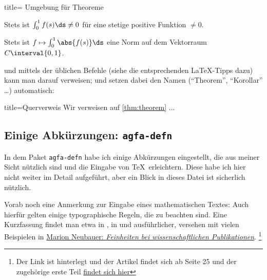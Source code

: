 \begin{tcblisting}{title= Umgebung für Theoreme}
%
\begin{theorem}\label{thm:theorem}
Stets ist $ \int_{ 0 }^{ 1 } f(s) \ds \neq 0 $ für eine stetige positive Funktion $ \neq 0 $.
\end{theorem}
%
\begin{corollary}\label{cor:folgerung}
Stets ist $ f \mapsto \int_{ 0 }^{ 1 } \abs{ f(s) }\ds $ eine Norm auf dem Vektorraum 
$ C\interval{0,1} $.
\end{corollary}
%
\end{tcblisting}
%
und mittels der üblichen Befehle (siehe die entsprechenden \LaTeX{}-Tipps dazu) kann man darauf verweisen;  und  setzen dabei den Namen (\enquote{Theorem}, \enquote{Korollar} \ldots) automatisch:
%
\begin{tcblisting}{title=Querverweis} 
Wir verweisen auf \vref{thm:theorem} ...
\end{tcblisting}
%
%
\subsection{Einige Abkürzungen: \texttt{agfa-defn}}\label{agfa-defn}
In dem Paket \texttt{agfa-defn} habe ich einige Abkürzungen eingestellt, die aus meiner Sicht nützlich sind und die Eingabe von \TeX\ erleichtern.
Diese habe ich hier nicht weiter im Detail aufgeführt, aber ein Blick in dieses Datei ist sicherlich nützlich.

Vorab noch eine Anmerkung zur Eingabe eines mathematischen Textes: Auch hierfür gelten einige typographische Regeln, die zu beachten sind.
Eine Kurzfassung findet man etwa in \textcite{nadler:formelsatz}, in \textcite[Kap. 9.1]{voss:2012a} und ausführlicher, versehen mit vielen Beispielen in \href{https://archiv.dante.de/DTK/PDF/komoedie_1997_1.pdf}{Marion Neubauer: \emph{Feinheiten bei wissenschaftlichen Publikationen}}.%
\footnote{Der Link ist hinterlegt und der Artikel findet sich ab Seite 25 und der zugehörige erste Teil \href{https://archiv.dante.de/DTK/PDF/komoedie_1996_4.pdf}{findet sich hier}}

